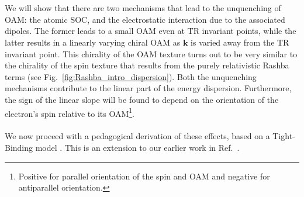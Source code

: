 \\\\
We will show that there are two mechanisms that lead to the unquenching of OAM: the atomic SOC, and the electrostatic interaction due to the associated dipoles.
The former leads to a small OAM even at TR invariant points, while the latter results in a linearly varying chiral OAM as $\bm k$ is varied away from the TR invariant point.
This chirality of the OAM texture turns out to be very similar to the chirality of the spin texture that results from the purely relativistic Rashba terms (see Fig.~\ref{fig:Rashba_intro_dispersion}).
Both the unquenching mechanisms contribute to the linear part of the energy dispersion.
Furthermore, the sign of the linear slope will be found to depend on the orientation of the electron's spin relative to its OAM\footnote{Positive for parallel orientation of the spin and OAM and negative for antiparallel orientation.}.
\\\\
We now proceed with a pedagogical derivation of these effects, based on a Tight-Binding model \cite{Petersen2000,Kim2014,Go2016}. This is an extension to our earlier work in Ref.~\cite{Ponet2018}.


